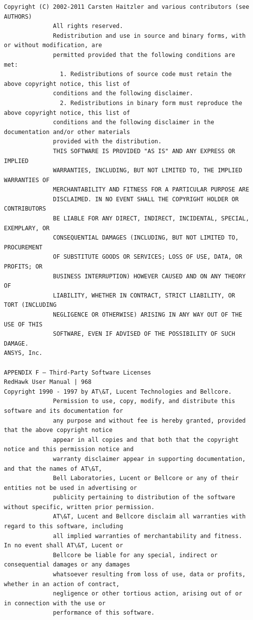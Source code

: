 \begin{lstlisting}[basicstyle=\ttfamily\scriptsize,breaklines=true]
Copyright (C) 2002-2011 Carsten Haitzler and various contributors (see AUTHORS)
              All rights reserved.
              Redistribution and use in source and binary forms, with or without modification, are
              permitted provided that the following conditions are met:
                1. Redistributions of source code must retain the above copyright notice, this list of
              conditions and the following disclaimer.
                2. Redistributions in binary form must reproduce the above copyright notice, this list of
              conditions and the following disclaimer in the documentation and/or other materials
              provided with the distribution.
              THIS SOFTWARE IS PROVIDED "AS IS" AND ANY EXPRESS OR IMPLIED
              WARRANTIES, INCLUDING, BUT NOT LIMITED TO, THE IMPLIED WARRANTIES OF
              MERCHANTABILITY AND FITNESS FOR A PARTICULAR PURPOSE ARE
              DISCLAIMED. IN NO EVENT SHALL THE COPYRIGHT HOLDER OR CONTRIBUTORS
              BE LIABLE FOR ANY DIRECT, INDIRECT, INCIDENTAL, SPECIAL, EXEMPLARY, OR
              CONSEQUENTIAL DAMAGES (INCLUDING, BUT NOT LIMITED TO, PROCUREMENT
              OF SUBSTITUTE GOODS OR SERVICES; LOSS OF USE, DATA, OR PROFITS; OR
              BUSINESS INTERRUPTION) HOWEVER CAUSED AND ON ANY THEORY OF
              LIABILITY, WHETHER IN CONTRACT, STRICT LIABILITY, OR TORT (INCLUDING
              NEGLIGENCE OR OTHERWISE) ARISING IN ANY WAY OUT OF THE USE OF THIS
              SOFTWARE, EVEN IF ADVISED OF THE POSSIBILITY OF SUCH DAMAGE.
ANSYS, Inc.

APPENDIX F — Third-Party Software Licenses                                     RedHawk User Manual | 968
Copyright 1990 - 1997 by AT\&T, Lucent Technologies and Bellcore.
              Permission to use, copy, modify, and distribute this software and its documentation for
              any purpose and without fee is hereby granted, provided that the above copyright notice
              appear in all copies and that both that the copyright notice and this permission notice and
              warranty disclaimer appear in supporting documentation, and that the names of AT\&T,
              Bell Laboratories, Lucent or Bellcore or any of their entities not be used in advertising or
              publicity pertaining to distribution of the software without specific, written prior permission.
              AT\&T, Lucent and Bellcore disclaim all warranties with regard to this software, including
              all implied warranties of merchantability and fitness. In no event shall AT\&T, Lucent or
              Bellcore be liable for any special, indirect or consequential damages or any damages
              whatsoever resulting from loss of use, data or profits, whether in an action of contract,
              negligence or other tortious action, arising out of or in connection with the use or
              performance of this software.
\end{lstlisting}

